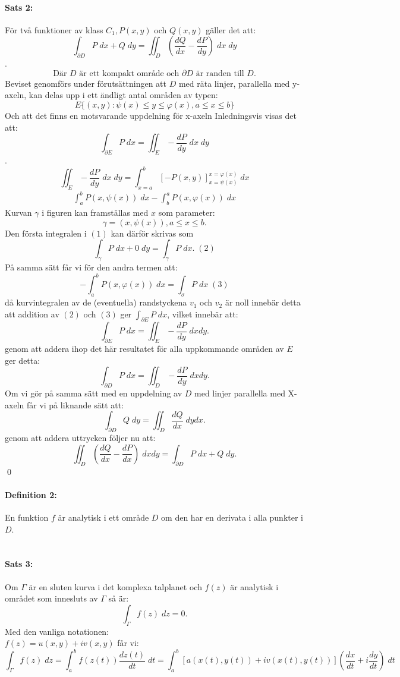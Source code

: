 \documentclass{article}
\begin{document}
\paragraph{Sats 2:} För två funktioner av klass $C_1, P(x, y)$ och $Q(x, y)$ gäller det att:
$$\int_{\partial D} P\; dx + Q \; dy = \iint_D \left ( \frac {d Q} {d x} - \frac {d P} {d y}
	\right ) \; dx \; dy$$.
$$\text{Där $D$ är ett kompakt område och $\partial D$ är randen till $D$.}$$
Beviset genomförs under förutsättningen att $D$ med räta linjer, parallella med y-axeln, kan delas upp i ett 
ändligt antal områden av typen:
$$E \{ (x, y): \psi(x) \le y \le \varphi(x), a \le x \le b \}$$
Och att det finns en motsvarande uppdelning för x-axeln
Inledningsvis visas det att:
$$\int_{\partial E} P \; dx = \iint_E - \frac {dP} {dy} \; dx \; dy$$.
$$\iint_E - \frac {dP} {dy} \; dx \; dy = \int^b_{x=a} \left [ -P (x, y) \right ]^{x = \varphi(x)}_{x= \psi(x)} \; dx$$
\begin{align}
	\int_a^bP(x, \psi(x)) \; dx - \int_b^aP(x, \varphi(x)) \; dx
\end{align}
Kurvan $\gamma$ i figuren kan framställas med $x$ som parameter:
$$\gamma = (x, \psi(x)), a\le x \le b.$$
Den första integralen i $(1)$ kan därför skrivas som 
$$\int_{\gamma} P \; dx + 0 \; dy = \int_{\gamma} P \; dx. \; (2)$$
På samma sätt får vi för den andra termen att:
$$- \int_a^b P(x, \varphi(x)) \; dx = \int_{\sigma} P \; dx \; (3)$$ %
då kurvintegralen av de (eventuella) randstyckena $v_1$ och $v_2$ är noll innebär detta att
addition av $(2)$ och $(3)$ ger $\int_{\partial E} P \; dx$, vilket
innebär att:
$$\int_{\partial E} P \; dx = \iint_E - \frac {dP} {dy} \; dx dy.$$
genom att addera ihop det här resultatet för alla uppkommande områden av $E$ ger detta:
$$\int_{\partial D} P \; dx = \iint_D - \frac {dP} {dy} \; dx dy.$$
Om vi gör på samma sätt med en uppdelning av $D$ med linjer parallella med X-axeln får vi på liknande sätt att:
$$\int_{\partial D} Q \; dy = \iint_D \frac {dQ} {dx} \; dy dx.$$ 
genom att addera uttrycken följer nu att:
$$\iint_D \left ( \frac {dQ} {dx} - \frac {dP} {dx} \right ) \; dx dy = \int_{\partial D} P \; dx + Q \; dy.$$
\hfill \qed
\paragraph{Definition 2:} En funktion $f$ är analytisk i ett område $D$ om den har en derivata i alla punkter i $D$.\\
\\
\paragraph{Sats 3:} Om $\Gamma$ är en sluten kurva i det komplexa talplanet och $f(z)$ är analytisk i området som innesluts av $\Gamma$ så är:
$$\int_{\Gamma} f(z) \; dz = 0.$$
Med den vanliga notationen:\\
$f(z) = u(x, y) + iv(x, y)$ får vi:
$$\int_{\Gamma} f(z) \; dz = \int_a^b f(z(t)) \frac {dz(t)} {dt} \; dt = \int_a^b [a(x(t), y(t)) + iv(x(t), y(t)) ]
\left ( \frac {dx} {dt} + i \frac {dy} {dt} \right ) \; dt$$
\end{document}
